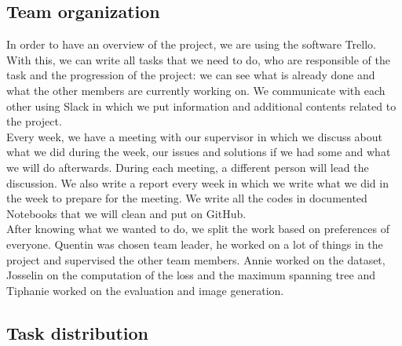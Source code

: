 \subsection{Team organization}

In order to have an overview of the project, we are using the software Trello.
With this, we can write all tasks that we need to do, who are responsible of
the task and the progression of the project: we can see what is already done
and what the other members are currently working on. We communicate with each
other using Slack in which we put information and additional contents related
to the project. \\

Every week, we have a meeting with our supervisor in which we discuss about
what we did during the week, our issues and solutions if we had some and what
we will do afterwards. During each meeting, a different person will lead the
discussion. We also write a report every week in which we write what we did in
the week to prepare for the meeting. We write all the codes in documented
Notebooks that we will clean and put on GitHub. \\

After knowing what we wanted to do, we split the work based on preferences of
everyone. Quentin was chosen team leader, he worked on a lot of things in the
project and supervised the other team members. Annie worked on the dataset,
Josselin on the computation of the loss and the maximum spanning tree and
Tiphanie worked on the evaluation and image generation. \\


\subsection{Task distribution}

